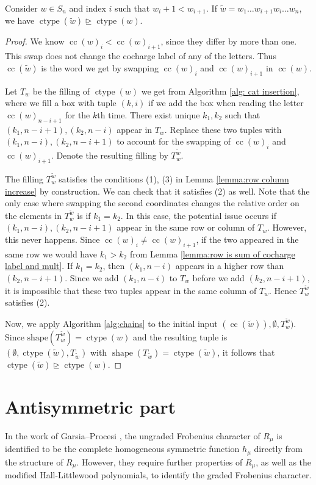 \documentclass[ALCO, Unicode]{cedram}
\DeclareMathOperator{\ctype}{ctype}
\DeclareMathOperator{\shape}{shape}
\DeclareMathOperator{\cc}{cc}
\begin{document}
\begin{prop}\label{prop: swaps raise ctype}
   Consider $w\in S_n$ and index $i$ such that $w_i  +1 < w_{i+1}$. If $\tilde{w} = w_1\dots w_{i+1}w_i\dots w_n$, we have $\ctype(\tilde{w}) \unrhd \ctype(w)$.
\end{prop}
\begin{proof}
    We know  $\cc(w)_i < \cc(w)_{i+1}$, since they differ by more than one. This swap does not change the cocharge label of any of the letters. 
    Thus $\cc(\tilde{w})$ is the word we get by swapping $\cc(w)_i$ and $\cc(w)_{i+1}$ in $\cc(w)$.

    Let $T_w$ be the filling of $\ctype(w)$ we get from Algorithm \ref{alg: cat insertion}, where we fill a box with tuple $(k,i)$ if we add the box when reading the letter $\cc(w)_{n-i + 1}$ for the $k$th time. There exist unique $k_1,k_2$ such that $(k_1,n-i+1), (k_2,n-i)$ appear in $T_w$. Replace these two tuples with  $(k_1,n-i), (k_2,n-i+1)$ to account for the swapping of $\cc(w)_i$ and $\cc(w)_{i+1}$. Denote the resulting filling by $T_{w}^{\tilde{w}}$.

    The filling $T_{w}^{\tilde{w}}$ satisfies the conditions (1), (3) in Lemma \ref{lemma:row column increase} by construction. We can check that it satisfies (2) as well. 
    Note that the only case where swapping the second coordinates changes the relative order on the elements in $T_{w}^{\tilde{w}}$ is if $k_1 = k_2$. 
    In this case, the potential issue occurs if $(k_1,n-i), (k_2,n-i+1)$ appear in the same row or column of $T_w$.
    However, this never happens. Since $\cc(w)_i \neq \cc(w)_{i+1}$, if the two appeared in the same row we would have $k_1 > k_2$ from Lemma \ref{lemma:row is sum of cocharge label and mult}.
    If $k_1 = k_2$, then $(k_1,n-i)$ appears in a higher row than $ (k_2,n-i+1)$. Since we add $(k_1,n-i)$ to $T_w$ before we add $(k_2,n-i+1)$, it is impossible that these two tuples appear in the same column of $T_w$. Hence $T_{w}^{\tilde{w}}$ satisfies (2).

    Now, we apply Algorithm \ref{alg:chains} to the initial input $(\cc(\tilde{w})), \emptyset, T_{w}^{\tilde{w}})$. 
    Since $\text{shape}(T_{w}^{\tilde{w}}) = \ctype(w)$ and the resulting tuple is $(\emptyset, \ctype(\tilde{w}), T_{\tilde{w}})$ with $\shape (T_{\tilde{w}}) = \ctype(\tilde{w})$, it follows that $\ctype(\tilde{w}) \unrhd \ctype(w)$. 
\end{proof}


\section{Antisymmetric part}\label{sec: remarks}
In the work of Garsia--Procesi \cite[Section 3]{GP}, the ungraded Frobenius character of $R_\mu$ is identified to be the complete homogeneous symmetric function $h_\mu$ directly from the structure of $R_\mu$. 
However, they require further properties of $R_\mu$, as well as the modified Hall-Littlewood polynomials, to identify the graded Frobenius character. 
\end{document}
